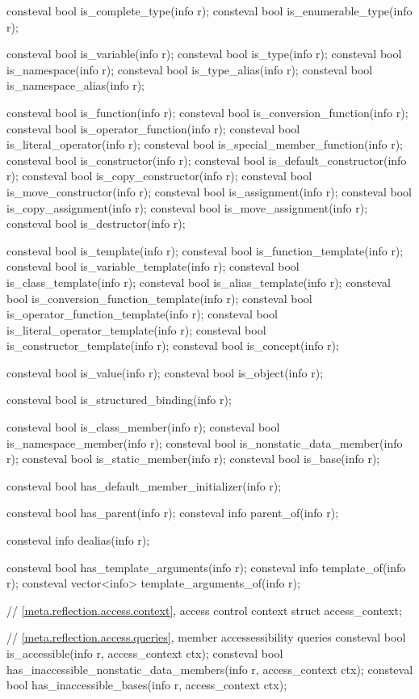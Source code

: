 \begin{codeblock}
{  consteval bool is_complete_type(info r);
  consteval bool is_enumerable_type(info r);

  consteval bool is_variable(info r);
  consteval bool is_type(info r);
  consteval bool is_namespace(info r);
  consteval bool is_type_alias(info r);
  consteval bool is_namespace_alias(info r);

  consteval bool is_function(info r);
  consteval bool is_conversion_function(info r);
  consteval bool is_operator_function(info r);
  consteval bool is_literal_operator(info r);
  consteval bool is_special_member_function(info r);
  consteval bool is_constructor(info r);
  consteval bool is_default_constructor(info r);
  consteval bool is_copy_constructor(info r);
  consteval bool is_move_constructor(info r);
  consteval bool is_assignment(info r);
  consteval bool is_copy_assignment(info r);
  consteval bool is_move_assignment(info r);
  consteval bool is_destructor(info r);

  consteval bool is_template(info r);
  consteval bool is_function_template(info r);
  consteval bool is_variable_template(info r);
  consteval bool is_class_template(info r);
  consteval bool is_alias_template(info r);
  consteval bool is_conversion_function_template(info r);
  consteval bool is_operator_function_template(info r);
  consteval bool is_literal_operator_template(info r);
  consteval bool is_constructor_template(info r);
  consteval bool is_concept(info r);

  consteval bool is_value(info r);
  consteval bool is_object(info r);

  consteval bool is_structured_binding(info r);

  consteval bool is_class_member(info r);
  consteval bool is_namespace_member(info r);
  consteval bool is_nonstatic_data_member(info r);
  consteval bool is_static_member(info r);
  consteval bool is_base(info r);

  consteval bool has_default_member_initializer(info r);

  consteval bool has_parent(info r);
  consteval info parent_of(info r);

  consteval info dealias(info r);

  consteval bool has_template_arguments(info r);
  consteval info template_of(info r);
  consteval vector<info> template_arguments_of(info r);

  // \ref{meta.reflection.access.context}, access control context
  struct access_context;

  // \ref{meta.reflection.access.queries}, member accessessibility queries
  consteval bool is_accessible(info r, access_context ctx);
  consteval bool has_inaccessible_nonstatic_data_members(info r, access_context ctx);
  consteval bool has_inaccessible_bases(info r, access_context ctx);

}
\end{codeblock}
